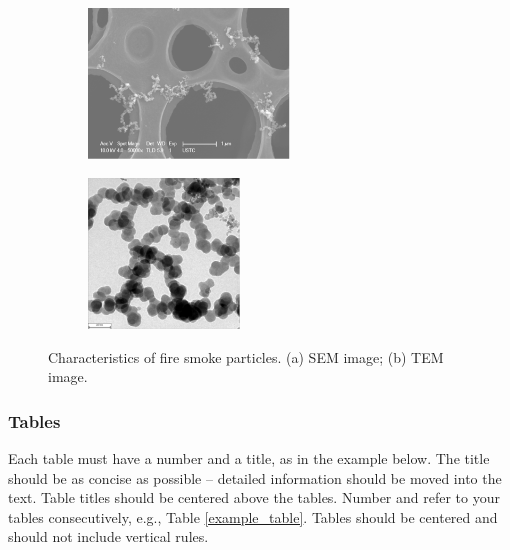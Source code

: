 \documentclass[fleqn,b5paper,10pt]{article}
\begin{document}
\begin{figure}[ht]
    \centering
    \begin{subfigure}[b]{0.35\textwidth}
        \centering
        \includegraphics[height=4cm]{fig2a.png} %
        \caption{}
        \label{fig:subfig1}
    \end{subfigure}
    \hspace{1cm} %
    \begin{subfigure}[b]{0.35\textwidth}
        \centering
        \includegraphics[height=4cm]{fig2b.png} %
        \caption{}
        \label{fig:subfig2}
    \end{subfigure}
    \caption{Characteristics of fire smoke particles. (a) SEM image; (b) TEM image.}
    \label{fig:smoke}
\end{figure}

\subsubsection*{Tables}

Each table must have a number and a title, as in the example below. The title should be as concise as possible -- detailed information should be moved into the text. Table titles should be centered above the tables. Number and refer to your tables consecutively, e.g., Table \ref{example_table}. Tables should be centered and should not include vertical rules.
\end{document}
